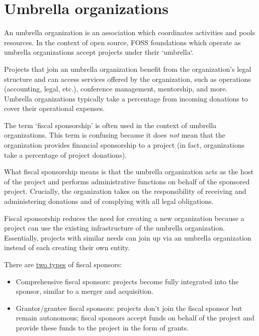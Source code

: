 


\chapter{Umbrella organizations}

An umbrella organization is an association which coordinates activities and pools resources.  In the context of open source, FOSS foundations which operate as umbrella organizations accept projects under their `umbrella`.

Projects that join an umbrella organization benefit from the organization's legal structure and can access services offered by the organization, such as operations (accounting, legal, etc.), conference management, mentorship, and more.  Umbrella organizations typically take a percentage from incoming donations to cover their operational expenses.

The term `fiscal sponsorship' is often used in the context of umbrella organizations.  This term is confusing because it does \textit{not} mean that the organization provides financial sponsorship to a project (in fact, organizations take a percentage of project donations).

What fiscal sponsorship means is that the umbrella organization acts as the host of the project and performs administrative functions on behalf of the sponsored project.  Crucially, the organization takes on the responsibility of receiving and administering donations and of complying with all legal obligations.

Fiscal sponsorship reduces the need for creating a new organization because a project can use the existing infrastructure of the umbrella organization.  Essentially, projects with similar needs can join up via an umbrella organization instead of each creating their own entity.

There are \href{https://lwn.net/Articles/548542/}{two types} of fiscal sponsors:

\begin{itemize}

\item Comprehensive fiscal sponsors: projects become fully integrated into the sponsor, similar to a merger and acquisition.

\item Grantor/grantee fiscal sponsors: projects don't join the fiscal sponsor but remain autonomous; fiscal sponsors accept funds on behalf of the project and provide these funds to the project in the form of grants.

\end{itemize}

